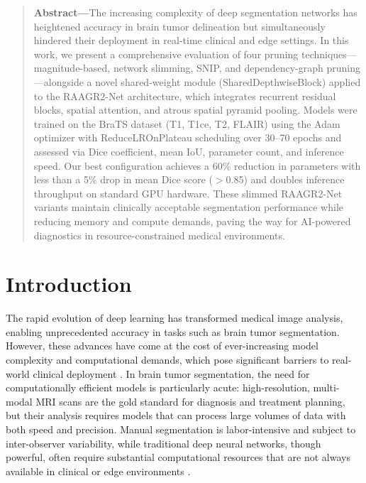 \documentclass[12pt,a4paper]{article}
\begin{document}
\newpage

\begin{abstract}
\noindent\textbf{Abstract---}The increasing complexity of deep segmentation networks has heightened accuracy in brain tumor delineation but simultaneously hindered their deployment in real-time clinical and edge settings. In this work, we present a comprehensive evaluation of four pruning techniques---magnitude-based, network slimming, SNIP, and dependency-graph pruning---alongside a novel shared-weight module (SharedDepthwiseBlock) applied to the RAAGR2-Net architecture, which integrates recurrent residual blocks, spatial attention, and atrous spatial pyramid pooling. Models were trained on the BraTS dataset (T1, T1ce, T2, FLAIR) using the Adam optimizer with ReduceLROnPlateau scheduling over 30--70 epochs and assessed via Dice coefficient, mean IoU, parameter count, and inference speed. Our best configuration achieves a 60\% reduction in parameters with less than a 5\% drop in mean Dice score ($>$0.85) and doubles inference throughput on standard GPU hardware. These slimmed RAAGR2-Net variants maintain clinically acceptable segmentation performance while reducing memory and compute demands, paving the way for AI-powered diagnostics in resource-constrained medical environments.
\end{abstract}

\newpage
\tableofcontents
\newpage

\section{Introduction}

The rapid evolution of deep learning has transformed medical image analysis, enabling unprecedented accuracy in tasks such as brain tumor segmentation. However, these advances have come at the cost of ever-increasing model complexity and computational demands, which pose significant barriers to real-world clinical deployment \citep{Yang2025, Mazurek2024, Wu2023, Ragab2024}. In brain tumor segmentation, the need for computationally efficient models is particularly acute: high-resolution, multi-modal MRI scans are the gold standard for diagnosis and treatment planning, but their analysis requires models that can process large volumes of data with both speed and precision. Manual segmentation is labor-intensive and subject to inter-observer variability, while traditional deep neural networks, though powerful, often require substantial computational resources that are not always available in clinical or edge environments \citep{Yang2025, Ragab2024}.
\end{document}
